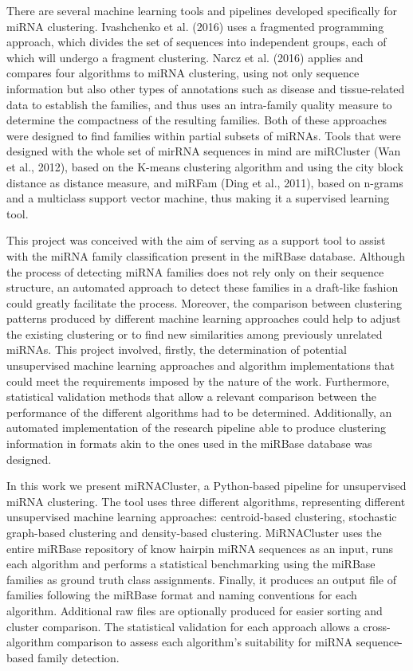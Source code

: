 \documentclass[nocrop]{bioinfo}
\begin{document}
There are several machine learning tools and pipelines developed specifically for miRNA clustering. Ivashchenko et al. (2016) uses a fragmented programming approach, which divides the set of sequences into independent groups, each of which will undergo a fragment clustering. Narcz et al. (2016) applies and compares four algorithms to miRNA clustering, using not only sequence information but also other types of annotations such as disease and tissue-related data to establish the families, and thus uses an intra-family quality measure to determine the compactness of the resulting families. Both of these approaches were designed to find families within partial subsets of miRNAs. Tools that were designed with the whole set of mirRNA sequences in mind are miRCluster (Wan et al., 2012), based on the K-means clustering algorithm and using the city block distance as distance measure, and miRFam (Ding et al., 2011), based on n-grams and a multiclass support vector machine, thus making it a supervised learning tool.

This project was conceived with the aim of serving as a support tool to assist with the miRNA family classification present in the miRBase database. Although the process of detecting miRNA families does not rely only on their sequence structure, an automated approach to detect these families in a draft-like fashion could greatly facilitate the process. Moreover, the comparison between clustering patterns produced by different machine learning approaches could help to adjust the existing clustering or to find new similarities among previously unrelated miRNAs. This project involved, firstly, the determination of potential unsupervised machine learning approaches and algorithm implementations that could meet the requirements imposed by the nature of the work. Furthermore, statistical validation methods that allow a relevant comparison between the performance of the different algorithms had to be determined. Additionally, an automated implementation of the research pipeline able to produce clustering information in formats akin to the ones used in the miRBase database was designed.

In this work we present miRNACluster, a Python-based pipeline for unsupervised miRNA clustering. The tool uses three different algorithms, representing different unsupervised machine learning approaches: centroid-based clustering, stochastic graph-based clustering and density-based clustering. MiRNACluster uses the entire miRBase repository of know hairpin miRNA sequences as an input, runs each algorithm and performs a statistical benchmarking using the miRBase families as ground truth class assignments. Finally, it produces an output file of families following the miRBase format and naming conventions for each algorithm. Additional raw files are optionally produced for easier sorting and cluster comparison. The statistical validation for each approach allows a cross-algorithm comparison to assess each algorithm's suitability for miRNA sequence-based family detection.
\end{document}
